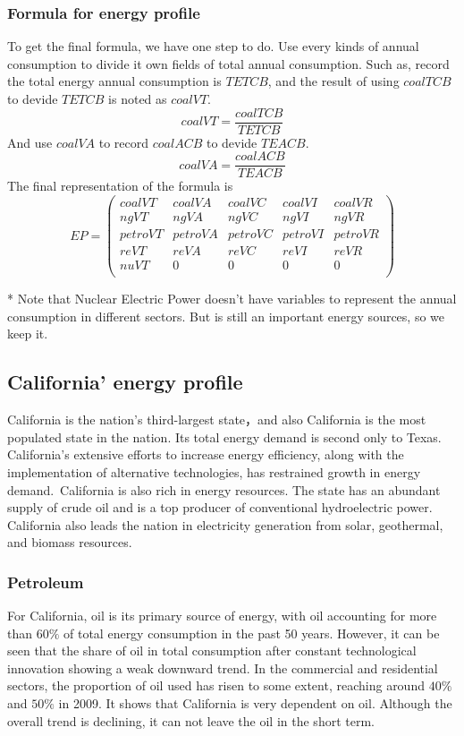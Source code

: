 \documentclass{mcmthesis}
\begin{document}
\subsubsection{Formula for energy profile}
To get the final formula, we have one step to do. Use every kinds of annual consumption to divide it own fields of total annual consumption.
Such as, record the total energy annual consumption is $TETCB$, and the result of using $coalTCB$ to devide $TETCB$ is noted as $coalVT$.
$$coalVT = \frac{coalTCB}{TETCB}$$
And use $coalVA$ to record $coalACB$ to devide $TEACB$.
$$coalVA = \frac{coalACB}{TEACB}$$
The final representation of the formula is
$$
  EP =
  \begin{pmatrix}
  coalVT & coalVA & coalVC & coalVI & coalVR  \\
  ngVT & ngVA & ngVC & ngVI & ngVR \\
  petroVT &　petroVA & petroVC & petroVI & petroVR \\
  reVT & reVA & reVC & reVI & reVR \\
  nuVT & 0 & 0 & 0 & 0\\
  \end{pmatrix}
$$

* Note that Nuclear Electric Power doesn't have variables to represent the annual consumption in different sectors.
But is still an important energy sources, so we keep it.

\subsection{California' energy profile}
California is the nation's third-largest state，and also California is the most populated state in the nation. Its total energy demand is second only to Texas.
California's extensive efforts to increase energy efficiency, along with the implementation of alternative technologies,
has restrained growth in energy demand. California is also rich in energy resources.
The state has an abundant supply of crude oil and is a top producer of conventional hydroelectric power.
California also leads the nation in electricity generation from solar, geothermal, and biomass resources.
\subsubsection{Petroleum}
  For California, oil is its primary source of energy, with oil accounting for more than $60\%$ of total energy consumption in the past 50 years.
  However, it can be seen that the share of oil in total consumption after constant technological innovation showing a weak downward trend.
  In the commercial and residential sectors, the proportion of oil used has risen to some extent, reaching around $40\%$ and $50\%$ in 2009.
  It shows that California is very dependent on oil. Although the overall trend is declining, it can not leave the oil in the short term.
\end{document}
